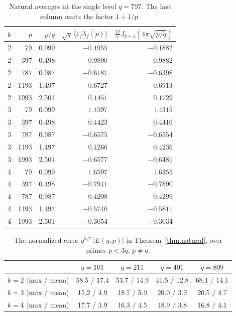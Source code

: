 \documentclass[11pt]{amsart}
\theoremstyle{remark}
\newcommand{\eps}{\varepsilon}
\newcommand{\ov}{\overline}
\begin{document}
\begin{table}[t]
\centering
\begin{tabular}{rrrrr}
\toprule
$k$ & $p$ & $p/q$ & $\sqrt q\,\langle\eps_f\ov{\lambda_f(p)}\rangle$ & $\frac{12}{\pi}J_{k-1}(4\pi\sqrt{p/q})$\\
\midrule
2 & 79 & 0.099 & $-0.1955$ & $-0.1882$ \\
2 & 397 & 0.498 & $0.9890$ & $0.9882$ \\
2 & 787 & 0.987 & $-0.6187$ & $-0.6398$ \\
2 & 1193 & 1.497 & $0.6727$ & $0.6913$ \\
2 & 1993 & 2.501 & $0.1451$ & $0.1729$ \\
3 & 79 & 0.099 & $1.4597$ & $1.4315$ \\
3 & 397 & 0.498 & $0.4423$ & $0.4416$ \\
3 & 787 & 0.987 & $-0.6575$ & $-0.6554$ \\
3 & 1193 & 1.497 & $0.4266$ & $0.4236$ \\
3 & 1993 & 2.501 & $-0.6577$ & $-0.6481$ \\
4 & 79 & 0.099 & $1.6597$ & $1.6355$ \\
4 & 397 & 0.498 & $-0.7941$ & $-0.7890$ \\
4 & 787 & 0.987 & $0.4208$ & $0.4299$ \\
4 & 1193 & 1.497 & $-0.5740$ & $-0.5811$ \\
4 & 1993 & 2.501 & $-0.3054$ & $-0.3034$ \\
\bottomrule
\end{tabular}
\caption{Natural averages at the single level $q=797$. The last column omits the factor $1+1/p$.}\label{tab}
\end{table}

\begin{table}[t]
\centering
\begin{tabular}{lcccc}
\toprule
 & $q=101$ & $q=211$ & $q=401$ & $q=809$\\
\midrule
$k=2$ (max / mean) & 58.5 / 17.4 & 53.7 / 14.9 & 41.5 / 12.8 & 68.1 / 14.1\\
$k=3$ (max / mean) & 15.2 / 4.9 & 18.7 / 5.0 & 20.0 / 3.9 & 20.5 / 4.7\\
$k=4$ (max / mean) & 17.7 / 3.9 & 16.3 / 4.5 & 18.9 / 3.8 & 16.8 / 4.1\\
\bottomrule
\end{tabular}
\caption{The normalized error $q^{3/2}\,|E(q,p)|$ in Theorem~\ref{thm:natural}, over primes $p<3q$, $p\neq q$.}\label{tab:err}
\end{table}
\end{document}
